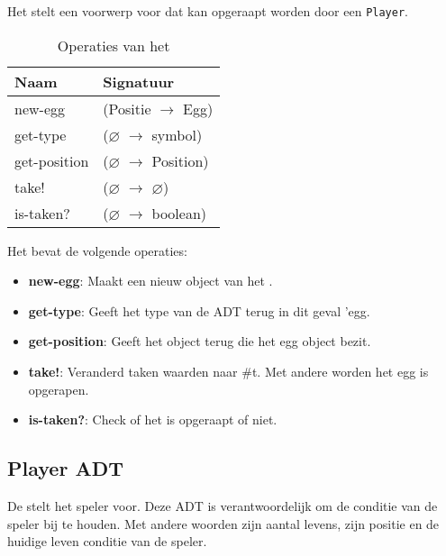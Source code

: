 Het \texttt{} stelt een voorwerp voor dat kan opgeraapt  worden door een \texttt{Player}.

\begin{table}[hbt]
\centering
\begin{tabular}{|ll|}
\hline
\rowcolor[HTML]{000000} 
{\color[HTML]{FFFFFF} \textbf{Naam}} & {\color[HTML]{FFFFFF} \textbf{Signatuur}} \\ \hline
new-egg                              & (Positie $\rightarrow$ Egg) \\ \hline
get-type         & ($\varnothing$ $\rightarrow$ symbol)                        \\ \hline
get-position         & ($\varnothing$ $\rightarrow$ Position)                        \\ \hline
take!                              & ($\varnothing$ $\rightarrow$ $\varnothing$)                   \\ \hline
is-taken?                         & ($\varnothing$ $\rightarrow$ boolean)               \\ \hline
\end{tabular}
\caption{Operaties van het \texttt{}}
\label{table:item}
\end{table}

Het \texttt{} bevat de volgende operaties:

\begin{itemize}
	\item \textbf{new-egg}: Maakt een nieuw object van het \texttt{}.
	\item \textbf{get-type}: Geeft het type van de ADT terug in dit geval 'egg.
	\item \textbf{get-position}: Geeft het \texttt{} object terug die het egg object bezit.
	\item \textbf{take!}: Veranderd taken waarden naar \#t.
		Met andere worden het egg is opgerapen.
	\item \textbf{is-taken?}: Check of het \texttt{} is opgeraapt of niet.
\end{itemize}

\subsection{Player ADT}
\label{section:player}
De \texttt{} stelt het speler voor.
Deze ADT is verantwoordelijk om de conditie van de speler bij te houden.
Met andere woorden zijn aantal levens, zijn positie en de huidige leven conditie van de speler.


